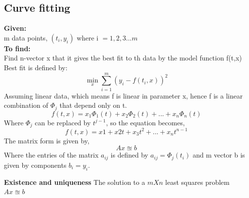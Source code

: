 \documentclass[12pt]{article}
\begin{document}
\subsection{Curve fitting}
\textbf{Given:}\\
m data points, $(t_i,y_i)$ where i $= 1,2,3 ... m$\\
\textbf{To find:}\\
Find n-vector x that it gives the best fit to th data by the model function f(t,x) \\
Best fit is defined by:\\
\begin{equation*}
\min_{x}\sum_{i=1}^{m} (y_i - f(t_i,x)) ^2
\end{equation*}
Assuming linear data, which means f is linear in parameter x, hence f is a linear combination of $\Phi_j$ that depend only on t.
\begin{equation*}
f(t,x) = x_1 \Phi_1(t) + x_2\Phi_2(t) + ... + x_n \Phi_n (t)
\end{equation*}
Where $\Phi_j$ can be replaced by $t^{j-1}$, so the equation becomes,
\begin{equation*}
f(t,x) = x1 + x2 t  + x_3 t^2 + ... + x_n t^{n-1}
\end{equation*}
The matrix form is given by,
\begin{equation*}
Ax \approxeq b
\end{equation*}
Where the entries of the matrix $a_{ij}$ is defined by $a_{ij} = \Phi_j(t_i)$ and m vector b is given by components $b_i = y_i$.

\textbf{Existence and uniqueness}
The solution to a $m X n$ least squares problem $Ax \approxeq b$ 
\end{document}
